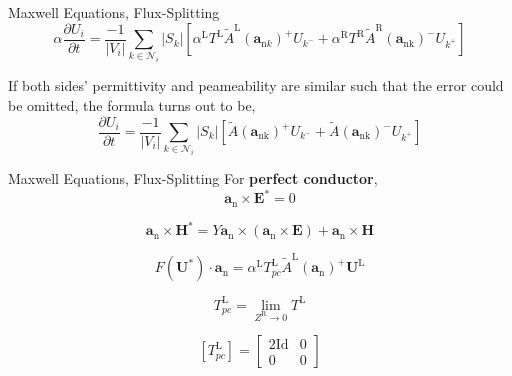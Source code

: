 \begin{frame}{Maxwell Equations, Flux-Splitting}
\begin{equation}
\alpha \frac{\partial U_{i}}{\partial t}=\frac{-1}{\left|V_{i}\right|} \sum_{k\in\mathcal{N}_i}\left|S_{k}\right|\left[\alpha^{\mathrm{L}} T^{\mathrm{L}} \tilde{A}^{\mathrm{L}}\left(\boldsymbol{a}_{\mathrm{n} k}\right)^{+} U_{k^{-}}+\alpha^{\mathrm{R}} T^{\mathrm{R}} \tilde{A}^{\mathrm{R}}\left(\boldsymbol{a}_{\mathrm{nk}}\right)^{-} U_{k^{+}}\right]
\end{equation}

If both sides' permittivity and peameability are similar such that the error could be omitted, the formula turns out to be,
\begin{equation}
\frac{\partial U_{i}}{\partial t}=\frac{-1}{\left|V_{i}\right|} \sum_{k\in\mathcal{N}_i}\left|S_{k}\right|\left[\tilde{A}\left(\boldsymbol{a}_{\mathrm{nk}}\right)^{+} U_{k^{-}}+\tilde{A}\left(\boldsymbol{a}_{\mathrm{nk}}\right)^{-} U_{k^{+}}\right]
\end{equation}
\end{frame}

\begin{frame}{Maxwell Equations, Flux-Splitting}
For \textbf{perfect conductor},
\begin{equation}
\boldsymbol{a}_{\mathrm{n}} \times \boldsymbol{E}^{*}=0
\end{equation}

\begin{equation}
\boldsymbol{a}_{\mathrm{n}} \times \boldsymbol{H}^{*}=Y \boldsymbol{a}_{\mathrm{n}} \times\left(\boldsymbol{a}_{\mathrm{n}} \times \boldsymbol{E}\right)+\boldsymbol{a}_{\mathrm{n}} \times \boldsymbol{H}
\end{equation}

\begin{equation}
F\left(\boldsymbol{U}^{*}\right) \cdot \boldsymbol{a}_{\mathrm{n}}=\alpha^{\mathrm{L}} T_{p c}^{\mathrm{L}} \tilde{A}^{\mathrm{L}}\left(\boldsymbol{a}_{\mathrm{n}}\right)^{+} \boldsymbol{U}^{\mathrm{L}}
\end{equation}

\begin{equation}
T_{p c}^{\mathrm{L}}=\lim _{Z^{\mathrm{R}} \rightarrow 0} T^{\mathrm{L}}
\end{equation}

\begin{equation}
\left[T_{p c}^{\mathrm{L}}\right]=\left[\begin{array}{cc}{2 \mathrm{Id}} & {0} \\ {0} & {0}\end{array}\right]
\end{equation}

\end{frame}

